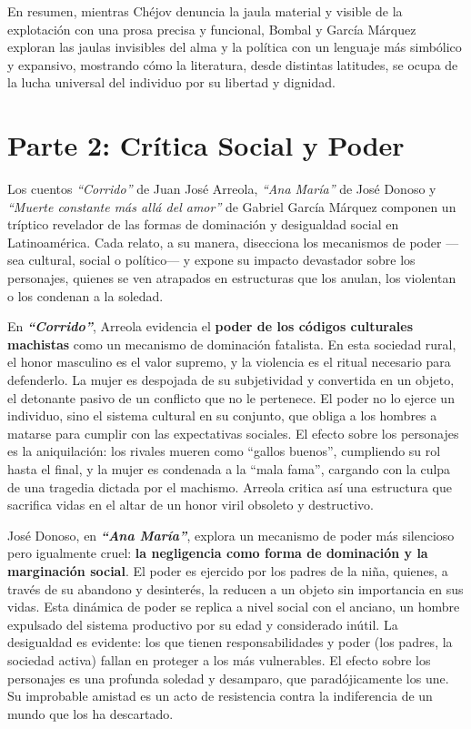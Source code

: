 \documentclass[12pt, letterpaper]{article}
\begin{document}
En resumen, mientras Chéjov denuncia la jaula material y visible de la explotación con una prosa precisa y funcional, Bombal y García Márquez exploran las jaulas invisibles del alma y la política con un lenguaje más simbólico y expansivo, mostrando cómo la literatura, desde distintas latitudes, se ocupa de la lucha universal del individuo por su libertad y dignidad.

\newpage

\section*{Parte 2: Crítica Social y Poder}

Los cuentos \textit{``Corrido''} de Juan José Arreola, \textit{``Ana María''} de José Donoso y \textit{``Muerte constante más allá del amor''} de Gabriel García Márquez componen un tríptico revelador de las formas de dominación y desigualdad social en Latinoamérica. Cada relato, a su manera, disecciona los mecanismos de poder —sea cultural, social o político— y expone su impacto devastador sobre los personajes, quienes se ven atrapados en estructuras que los anulan, los violentan o los condenan a la soledad.

En \textbf{\textit{``Corrido''}}, Arreola evidencia el \textbf{poder de los códigos culturales machistas} como un mecanismo de dominación fatalista. En esta sociedad rural, el honor masculino es el valor supremo, y la violencia es el ritual necesario para defenderlo. La mujer es despojada de su subjetividad y convertida en un objeto, el detonante pasivo de un conflicto que no le pertenece. El poder no lo ejerce un individuo, sino el sistema cultural en su conjunto, que obliga a los hombres a matarse para cumplir con las expectativas sociales. El efecto sobre los personajes es la aniquilación: los rivales mueren como ``gallos buenos'', cumpliendo su rol hasta el final, y la mujer es condenada a la ``mala fama'', cargando con la culpa de una tragedia dictada por el machismo. Arreola critica así una estructura que sacrifica vidas en el altar de un honor viril obsoleto y destructivo.

José Donoso, en \textbf{\textit{``Ana María''}}, explora un mecanismo de poder más silencioso pero igualmente cruel: \textbf{la negligencia como forma de dominación y la marginación social}. El poder es ejercido por los padres de la niña, quienes, a través de su abandono y desinterés, la reducen a un objeto sin importancia en sus vidas. Esta dinámica de poder se replica a nivel social con el anciano, un hombre expulsado del sistema productivo por su edad y considerado inútil. La desigualdad es evidente: los que tienen responsabilidades y poder (los padres, la sociedad activa) fallan en proteger a los más vulnerables. El efecto sobre los personajes es una profunda soledad y desamparo, que paradójicamente los une. Su improbable amistad es un acto de resistencia contra la indiferencia de un mundo que los ha descartado.
\end{document}
